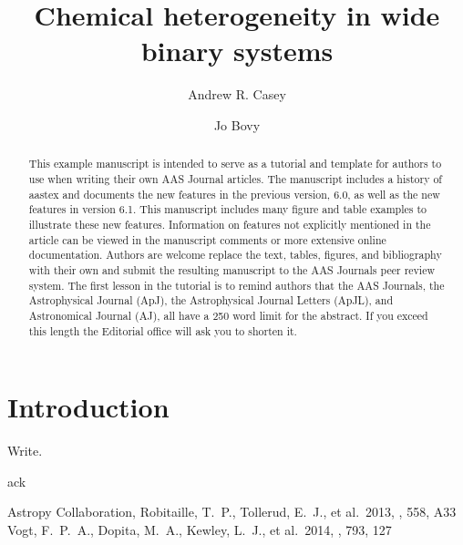 \documentclass{aastex61}
\begin{document}
\title{Chemical heterogeneity in wide binary systems}


\author[0000-0003-0174-0564]{Andrew R. Casey}

\author[0000-0001-6855-442X]{Jo Bovy}


\begin{abstract}
This example manuscript is intended to serve as a tutorial and template for
authors to use when writing their own AAS Journal articles. The manuscript
includes a history of aastex and documents the new features in the
previous version, 6.0, as well as the new features in version 6.1. This
manuscript includes many figure and table examples to illustrate these new
features.  Information on features not explicitly mentioned in the article
can be viewed in the manuscript comments or more extensive online
documentation. Authors are welcome replace the text, tables, figures, and
bibliography with their own and submit the resulting manuscript to the AAS
Journals peer review system.  The first lesson in the tutorial is to remind
authors that the AAS Journals, the Astrophysical Journal (ApJ), the
Astrophysical Journal Letters (ApJL), and Astronomical Journal (AJ), all
have a 250 word limit for the abstract.  If you exceed this length the
Editorial office will ask you to shorten it.
\end{abstract}

\keywords{}

\section{Introduction} 
\label{sec:introduction}
Write.


\acknowledgments

ack



\begin{thebibliography}{}

 Astropy Collaboration, Robitaille, T.~P., Tollerud, E.~J., et al.\ 2013, \aap, 558, A33 
 Vogt, F.~P.~A., Dopita, M.~A., Kewley, L.~J., et al.\ 2014, \apj, 793, 127  

\end{thebibliography}
\end{document}
